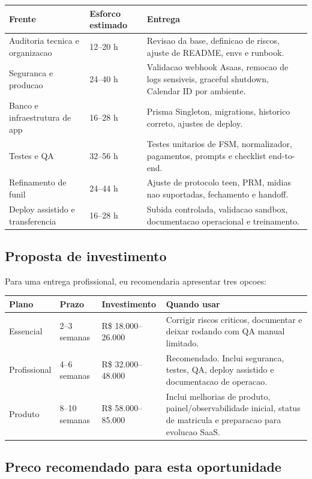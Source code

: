 \documentclass[11pt,a4paper]{article}
\begin{document}
\begin{longtable}{p{}p{}p{}}
\toprule
\textbf{Frente} & \textbf{Esforco estimado} & \textbf{Entrega} \\
\midrule
Auditoria tecnica e organizacao & 12--20 h & Revisao da base, definicao de riscos, ajuste de README, envs e runbook. \\
Seguranca e producao & 24--40 h & Validacao webhook Asaas, remocao de logs sensiveis, graceful shutdown, Calendar ID por ambiente. \\
Banco e infraestrutura de app & 16--28 h & Prisma Singleton, migrations, historico correto, ajustes de deploy. \\
Testes e QA & 32--56 h & Testes unitarios de FSM, normalizador, pagamentos, prompts e checklist end-to-end. \\
Refinamento de funil & 24--44 h & Ajuste de protocolo teen, PRM, midias nao suportadas, fechamento e handoff. \\
Deploy assistido e transferencia & 16--28 h & Subida controlada, validacao sandbox, documentacao operacional e treinamento. \\
\bottomrule
\end{longtable}

\subsection{Proposta de investimento}

Para uma entrega profissional, eu recomendaria apresentar tres opcoes:

\begin{longtable}{p{}p{}p{}p{}}
\toprule
\textbf{Plano} & \textbf{Prazo} & \textbf{Investimento} & \textbf{Quando usar} \\
\midrule
Essencial & 2--3 semanas & R\$ 18.000--26.000 & Corrigir riscos criticos, documentar e deixar rodando com QA manual limitado. \\
Profissional & 4--6 semanas & R\$ 32.000--48.000 & Recomendado. Inclui seguranca, testes, QA, deploy assistido e documentacao de operacao. \\
Produto & 8--10 semanas & R\$ 58.000--85.000 & Inclui melhorias de produto, painel/observabilidade inicial, status de matricula e preparacao para evolucao SaaS. \\
\bottomrule
\end{longtable}

\subsection{Preco recomendado para esta oportunidade}
\end{document}
